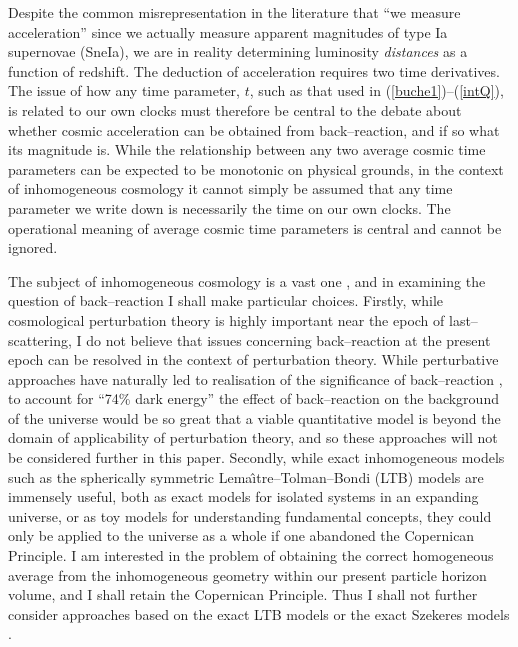 \documentclass[12pt]{iopart}
\begin{document}
Despite the common misrepresentation in the literature that ``we
measure acceleration'' since we actually measure apparent magnitudes of
type Ia supernovae (SneIa), we are in reality determining luminosity {\em
distances} as a function of redshift. The deduction of acceleration requires
two time derivatives. The issue of how any time parameter, $t$, such as
that used in (\ref{buche1})--(\ref{intQ}), is related to our own clocks
must therefore be central to the debate about whether cosmic acceleration
can be obtained from back--reaction, and if so what its magnitude is.
While the relationship between any two average cosmic time parameters
can be expected to be monotonic on physical grounds, in the context of
inhomogeneous cosmology it cannot simply be assumed that any time parameter
we write down is necessarily the time on our own clocks. The operational
meaning of average cosmic time parameters is central and cannot be ignored.

The subject of inhomogeneous cosmology is a vast one \cite{Krasinski},
and in examining the question of back--reaction I shall make particular
choices. Firstly, while cosmological perturbation theory is highly
important near the epoch of last--scattering, I do not believe that
issues concerning back--reaction at the present epoch can be resolved
in the context of perturbation theory. While perturbative approaches have
naturally led to realisation of the significance of back--reaction
\cite{kolb2}, to account for ``74\% dark energy'' the effect of
back--reaction on the background of the universe would be so great that
a viable quantitative model is beyond the domain of applicability of
perturbation theory, and so these approaches will not be considered further
in this paper. Secondly, while exact inhomogeneous models such as the
spherically symmetric Lema\^{\i}tre--Tolman--Bondi (LTB) models
\cite{LT,Bondi} are immensely useful, both as exact models for isolated
systems in an expanding universe, or as toy models for understanding
fundamental concepts, they could only be applied to the universe as a whole
if one abandoned the Copernican Principle. I am interested in the problem
of obtaining the correct homogeneous average from the inhomogeneous
geometry within our present particle horizon volume, and I shall retain the
Copernican Principle. Thus I shall not further consider approaches based on
the exact LTB models \cite{LT,Bondi} or the exact Szekeres models
\cite{Szek}.
\end{document}
